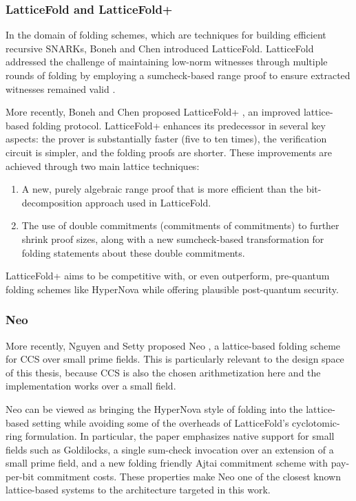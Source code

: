 \subsubsection{LatticeFold and LatticeFold+}

In the domain of folding schemes, which are techniques for building efficient
recursive SNARKs, Boneh and Chen introduced LatticeFold. LatticeFold addressed
the challenge of maintaining low-norm witnesses through multiple rounds of
folding by employing a sumcheck-based range proof to ensure extracted
witnesses remained valid \cite{LatticeFold}.

More recently, Boneh and Chen proposed LatticeFold+
\cite{LatticeFoldPlus}, an improved lattice-based folding protocol.
LatticeFold+ enhances its predecessor in several key aspects: the prover is
substantially faster (five to ten times), the verification circuit is simpler,
and the folding proofs are shorter. These improvements are achieved through
two main lattice techniques:

\begin{enumerate}
	\item A new, purely algebraic range proof that is more efficient than the
	      bit-decomposition approach used in LatticeFold.
	\item The use of double commitments (commitments of commitments) to
	      further shrink proof sizes, along with a new sumcheck-based
	      transformation for folding statements about these double commitments.
\end{enumerate}

LatticeFold+ aims to be competitive with, or even outperform, pre-quantum
folding schemes like HyperNova \cite{HyperNova} while offering plausible post-quantum security.

\subsubsection{Neo}

More recently, Nguyen and Setty proposed Neo \cite{Neo}, a lattice-based
folding scheme for CCS over small prime fields. This is particularly relevant to
the design space of this thesis, because CCS is also the chosen arithmetization
here and the implementation works over a small field.

Neo can be viewed as bringing the HyperNova style of folding into the
lattice-based setting while avoiding some of the overheads of LatticeFold's
cyclotomic-ring formulation. In particular, the paper emphasizes native support
for small fields such as Goldilocks, a single sum-check invocation over an
extension of a small prime field, and a new folding friendly Ajtai commitment
scheme with pay-per-bit commitment costs. These properties make Neo one of the
closest known lattice-based systems to the architecture targeted in this work.
